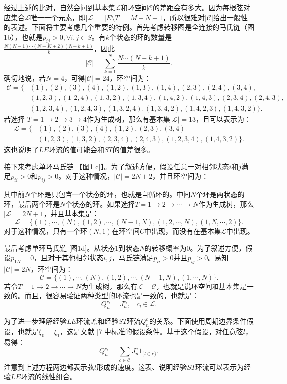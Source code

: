 经过上述的比对，自然会问到基本集$\mathcal{L}$和环空间$\mathcal{C}$的差距会有多大。因为每根弦对应集合$\mathcal{L}$唯一一个元素，即$|\mathcal{L}| = |E\setminus T| = M-N+1$，所以很难对$|\mathcal{C}|$给出一般性的表述。下面将主要考虑几个重要的特例。首先考虑转移图是全连接的马氏链（图1b），也就是$p_{ij}>0, \forall i,j \in S$。有$k$个状态的环的数量是$\frac{N (N-1) \cdots (N-K+2)(N-k+1)}{k}$，因此
\begin{equation*}
    |\mathcal{C}| = \sum_{k=1}^N\frac{N\cdots (N-k+1)}{k}.
\end{equation*}
确切地说，若$N=4$，可得$|\mathcal{C}|=24$，环空间为：
\begin{align*}
    \mathcal{C} = \{&(1),(2),(3),(4),(1,2),(1,3),(1,4),(2,3),(2,4),(3,4),\\
    &(1,2,3),(1,2,4),(1,3,2),(1,3,4),(1,4,2),(1,4,3),(2,3,4),(2,4,3),\\
    &(1,2,3,4),(1,2,4,3),(1,3,2,4),(1,3,4,2),(1,4,2,3),(1,4,3,2)\}.
\end{align*}
若选择 $T = 1\to 2\to 3\to 4$作为生成树，那么有基本集$|\mathcal{L}|=13$，且可以表示为：
\begin{align*}
    \mathcal{L} = \{&(1),(2),(3),(4),(1,2),(2,3),(3,4)\\
    &(1,2,3),(1,3,2),(2,3,4),(2,4,3),(1,2,3,4),(1,4,3,2)\}.
\end{align*}
这也说明了$LE$环流的值可能会和$ST$的值差很多。

接下来考虑单环马氏链 【图1 c]】。为了叙述方便，假设任意一对相邻状态$i$和$j$满足$p_{ii}>0$和$p_{ij}>0$。对于这种情况，$|\mathcal{C}| = 2N +2$，并且环空间为：

其中前$N$个环是只包含一个状态的环，也就是自循环的。中间$N$个环是两状态的环，最后两个环是$N$个状态的环。如果选择$T = 1\to 2\to\cdots \to N$作为生成树，那么$|\mathcal{L}| = 2N + 1$，并且基本集是：
\begin{equation*}
    \mathcal{L} = \{(1),\cdots,(N),(1,2),\cdots,(N-1,N),(1,2,\cdots,N),(1,N,\cdots,2)\}.
\end{equation*}
对于这种情况，只有一个环$(N, 1)$在环空间$C$中出现，而没有在基本集$\mathcal{L}$中出现。

最后考虑单环马氏链 [图1d]。从状态$1$到状态$N$的转移概率为$0$。为了叙述方便，假设$p_{1N}=0$，且对于其他相邻状态$i,j$，马氏链满足$p_{ii}>0$并且$p_{ij}>0$。易知$|\mathcal{C}|=2N$，环空间为：
\begin{equation*}
    \mathcal{C} = \{(1),\cdots,(N),(1,2),\cdots,(N-1,N),(1,\cdots,N)\}.
\end{equation*}
若令$T = 1\to 2\to\cdots \to N$为生成树，那么有$\mathcal{L} = \mathcal{C}$，也就是说环空间和基本集是一致的。而且，很容易验证两种类型的环流也是一致的，也就是：
\begin{equation}\label{same cycle current}
    Q_n^{c_l} = J^{c_l}_n,\;\;\;c_l\in \mathcal{L}.
\end{equation}

为了进一步理解经验$LE$环流$J_n^c$和经验$ST$环流$Q_n^c$的关系。下面使用周期边界条件假设，也就是$\xi_0 = \xi_1$，这是文献 [7]中标准的假设条件。基于这个假设，对任意弦$l$，易得：
\begin{equation}\label{conversion}
    Q_n^{c_l} = \sum_{c\in\mathcal{C}}J^c_n1_{\{l\in c\}}.
\end{equation}
注意到上述方程两边都表示弦$l$形成的速度。这表、说明经验$ST$环流可以表示为经验$LE$环流的线性组合。